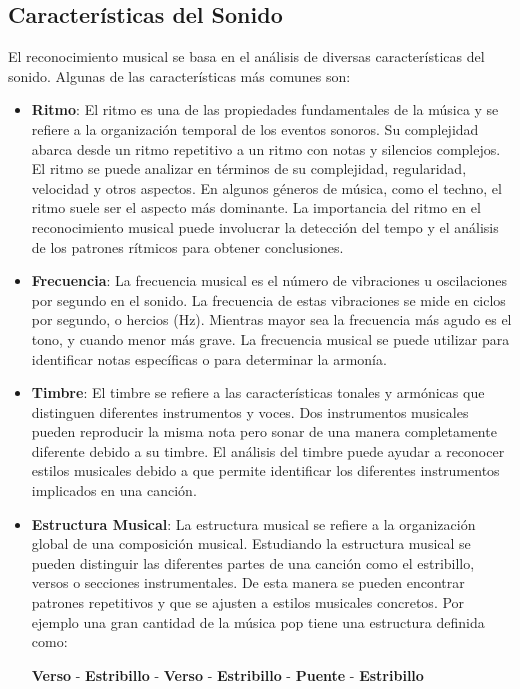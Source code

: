 \subsection{Características del Sonido}

El reconocimiento musical se basa en el análisis de diversas características del sonido. Algunas de las características más comunes son:

\begin{itemize}
\item \textbf{Ritmo}: El ritmo es una de las propiedades fundamentales de la música y se refiere a la organización temporal de los eventos sonoros. Su complejidad abarca desde un ritmo repetitivo a un ritmo con notas y silencios complejos.
El ritmo se puede analizar en términos de su complejidad, regularidad, velocidad y otros aspectos. En algunos géneros de música, como el techno, el ritmo suele ser el aspecto más dominante.
La importancia del ritmo en el reconocimiento musical puede involucrar la detección del tempo y el análisis de los patrones rítmicos para obtener conclusiones. \cite{Crossley-Holland}

\item \textbf{Frecuencia}: La frecuencia musical es el número de vibraciones u oscilaciones por segundo en el sonido. 
La frecuencia de estas vibraciones se mide en ciclos por segundo, o hercios (Hz). Mientras mayor sea la frecuencia más agudo es el tono, y cuando menor más grave.
La frecuencia musical se puede utilizar para identificar notas específicas o para determinar la armonía.

\item \textbf{Timbre}: El timbre se refiere a las características tonales y armónicas que distinguen diferentes instrumentos y voces. 
Dos instrumentos musicales pueden reproducir la misma nota pero sonar de una manera completamente diferente debido a su timbre.
El análisis del timbre puede ayudar a reconocer estilos musicales debido a que permite identificar los diferentes instrumentos implicados en una canción.

\item \textbf{Estructura Musical}: La estructura musical se refiere a la organización global de una composición musical.
Estudiando la estructura musical se pueden distinguir las diferentes partes de una canción como el estribillo, versos o secciones instrumentales. De esta manera se pueden encontrar patrones repetitivos y que se ajusten a estilos musicales concretos. 
Por ejemplo una gran cantidad de la música pop \cite{Team} tiene una estructura definida como: 

\begin{center}
\hfill \textbf{Verso} - \hfill \textbf{Estribillo} - \hfill \textbf{Verso} - \hfill \textbf{Estribillo} - \hfill \textbf{Puente} - \hfill \textbf{Estribillo}
\end{center}

\end{itemize}

